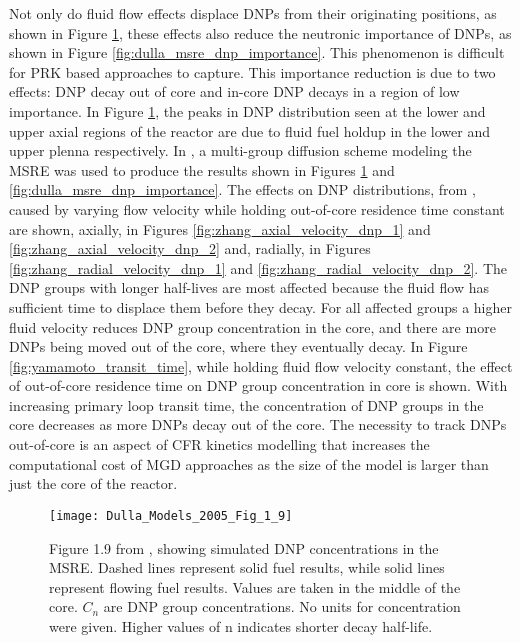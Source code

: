 \documentclass[review]{elsarticle}
\begin{document}
\par Not only do fluid flow effects displace DNPs from their originating positions,
as shown in Figure \ref{fig:dulla_msre_dnp_displacement}, these effects also
reduce the neutronic importance of DNPs, as shown in Figure
\ref{fig:dulla_msre_dnp_importance}. This phenomenon is difficult
for PRK based approaches to capture. This importance reduction is due to two
effects: DNP decay out of core and in-core DNP decays in a region of low
importance. In Figure \ref{fig:dulla_msre_dnp_displacement}, the peaks in DNP
distribution seen at the lower and upper axial regions of the reactor are
due to fluid fuel holdup in the lower and upper plenna respectively.
In \cite{dulla_models_2005}, a multi-group
diffusion scheme modeling the MSRE was used to produce the results shown
in Figures
\ref{fig:dulla_msre_dnp_displacement} and \ref{fig:dulla_msre_dnp_importance}.
The effects on DNP distributions, from \cite{zhang_development_2009-1}, caused
by varying flow velocity while holding out-of-core residence time constant are
shown, axially, in Figures \ref{fig:zhang_axial_velocity_dnp_1} and 
\ref{fig:zhang_axial_velocity_dnp_2} and, radially, in Figures
\ref{fig:zhang_radial_velocity_dnp_1} and \ref{fig:zhang_radial_velocity_dnp_2}.
The DNP groups with longer half-lives are most affected because the
fluid flow has sufficient time to displace them before they decay. For all
affected groups a higher fluid velocity reduces DNP group
concentration in the core, and there are more DNPs being moved out of the
 core, where they
eventually decay. In Figure \ref{fig:yamamoto_transit_time},
 while holding fluid flow velocity constant, the effect of
out-of-core residence time on DNP group concentration
in core is shown. With increasing primary loop transit time,
the concentration
of DNP groups in the core decreases as more DNPs decay out of the core.
The necessity to track DNPs out-of-core is an aspect of CFR kinetics
modelling that increases the computational cost of
MGD approaches as the size of the model is larger than just the
core of the reactor.

\begin{figure}[H]
   \centering
   \texttt{[image: Dulla\_Models\_2005\_Fig\_1\_9]}
   \caption{Figure 1.9 from \cite{dulla_models_2005}, 
    showing simulated DNP concentrations in the
    MSRE. Dashed lines represent
    solid fuel results, while solid lines represent flowing fuel results. Values
    are taken in the middle of the core. $C_{n}$ are DNP group concentrations. No units for concentration were given. Higher values of n indicates shorter
        decay half-life.}
   \label{fig:dulla_msre_dnp_displacement}
\end{figure}
\end{document}
